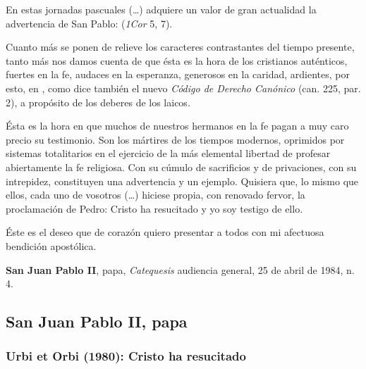 \begin{patercite}
En estas jornadas pascuales (\ldots) adquiere un valor de gran actualidad la advertencia de
San Pablo:  (\emph{1Cor} 5, 7).

Cuanto más se ponen de relieve los caracteres contrastantes del tiempo presente, tanto más nos damos cuenta de que ésta es la hora de los cristianos auténticos, fuertes en la fe, audaces en la esperanza, generosos en la caridad, ardientes, por esto, en , como dice también el nuevo \emph{Código de Derecho Canónico} (can. 225, par. 2), a propósito de los deberes de los laicos.

Ésta es la hora en que muchos de nuestros hermanos en la fe pagan a muy caro precio su testimonio. Son los mártires de los tiempos modernos, oprimidos por sistemas totalitarios en el ejercicio de la más elemental libertad de profesar abiertamente la fe religiosa. Con su cúmulo de sacrificios y de privaciones, con su intrepidez, constituyen una advertencia y un ejemplo. Quisiera que, lo mismo que ellos, cada uno de vosotros (\ldots) hiciese propia, con renovado fervor, la proclamación de Pedro: Cristo ha resucitado y yo soy testigo de ello.

Éste es el deseo que de corazón quiero presentar a todos con mi afectuosa bendición apostólica.

\textbf{San Juan Pablo II}, papa, \textit{Catequesis} audiencia general, 25 de abril de 1984, n. 4. 
\end{patercite}

\newsection

\subsection{San Juan Pablo II, papa}

\subsubsection{Urbi et Orbi (1980): Cristo ha resucitado}


